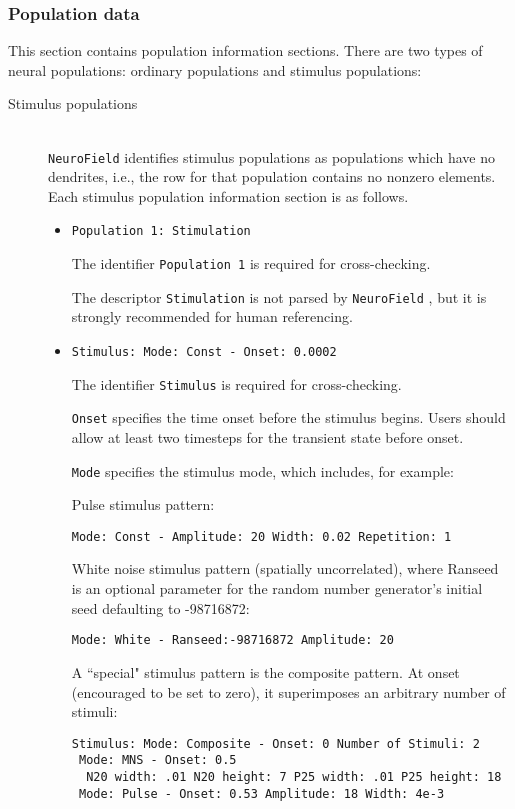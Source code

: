 \documentclass[12pt,a4paper]{article}
\newcommand{\type}[1]{ {\small\small\tt #1} }
\begin{document}
\subsubsection{Population data}
\label{sec:pop}
This section contains population information sections. There are two types of neural populations: ordinary populations and stimulus populations:
\begin{description}

\item[Stimulus populations]\ \\

\type{NeuroField} identifies stimulus populations as populations which have no dendrites, i.e., the row for that population contains no nonzero elements.  Each stimulus population information section is as follows.
\begin{itemize}
	\item \begin{lstlisting}
Population 1: Stimulation
	\end{lstlisting}
	The identifier \type{Population 1} is required for cross-checking.

	The descriptor \type{Stimulation} is not parsed by \type{NeuroField}, but it is strongly recommended for human referencing.
	\item
	\begin{lstlisting}
Stimulus: Mode: Const - Onset: 0.0002
	\end{lstlisting}
	The identifier \type{Stimulus} is required for cross-checking.

	\type{Onset} specifies the time onset before the stimulus begins. Users should allow at least two timesteps for the transient state before onset.

	\type{Mode} specifies the stimulus mode, which includes, for example:

	Pulse stimulus pattern:
	\begin{lstlisting}
Mode: Const - Amplitude: 20 Width: 0.02 Repetition: 1
	\end{lstlisting}

	White noise stimulus pattern (spatially uncorrelated), where Ranseed
is an optional parameter for the random number generator's initial seed defaulting to -98716872:
	\begin{lstlisting}
Mode: White - Ranseed:-98716872 Amplitude: 20
	\end{lstlisting}

	A ``special" stimulus pattern is the composite pattern. At onset (encouraged to be set to zero), it superimposes an arbitrary number of stimuli:
	\begin{lstlisting}
Stimulus: Mode: Composite - Onset: 0 Number of Stimuli: 2
 Mode: MNS - Onset: 0.5
  N20 width: .01 N20 height: 7 P25 width: .01 P25 height: 18
 Mode: Pulse - Onset: 0.53 Amplitude: 18 Width: 4e-3
	\end{lstlisting}


\end{itemize}
\end{description}
\end{document}
